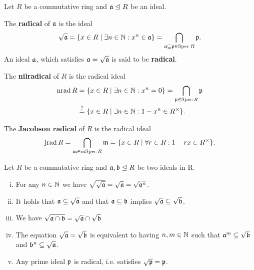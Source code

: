 	\begin{lemma}
	\end{lemma}

	\begin{definition}
		Let $R$ be a commutative ring and $\mathfrak{a} \trianglelefteq R$ be an ideal. 

		The \textbf{radical} of $\mathfrak{a}$ is the ideal 
		\begin{equation*}
			\sqrt{\mathfrak{a}} = \{x \in R \mid \exists n \in \mathbb{N}: x^n \in \mathfrak{a}\} = \bigcap \limits_{\mathfrak{a} \subseteq \mathfrak{p} \in \operatorname{Spec} R} \mathfrak{p}.
		\end{equation*}
		An ideal $\mathfrak{a}$, which satisfies $\mathfrak{a} = \sqrt{\mathfrak{a}}$ is said to be \textbf{radical}.

		The \textbf{nilradical} of $R$ is the radical ideal
		\begin{align*}
			\operatorname{nrad} R &= \{x \in R \mid \exists n \in \mathbb{N}: x^n = 0\} = \bigcap \limits_{\mathfrak{p} \in \operatorname{Spec} R} \mathfrak{p}\\
			& \overset{?}{=} \{x \in R \mid \exists n \in \mathbb{N}: 1 - x^n \in R^\times\}.
		\end{align*}

		The \textbf{Jacobson radical} of $R$ is the radical ideal
		\begin{equation*}
			\operatorname{jrad} R = \bigcap \limits_{\mathfrak{m} \in \operatorname{mSpec} R} \mathfrak{m} = \{x \in R \mid \forall r \in R: 1 - rx \in R^\times\}.
		\end{equation*}
	\end{definition}

	\begin{lemma}
		Let $R$ be a commutative ring and $\mathfrak{a},\mathfrak{b} \trianglelefteq R$ be two ideals in R.
		\begin{enumerate}[(i)]
			\item{
				For any $n \in \mathbb{N}$ we have $\sqrt{\sqrt{\mathfrak{a}}} = \sqrt{\mathfrak{a}} = \sqrt{\mathfrak{a}^n}$.
			}
			\item{
				It holds that $\mathfrak{a} \subseteq \sqrt{\mathfrak{a}}$ and that $\mathfrak{a} \subseteq \mathfrak{b}$ implies $\sqrt{\mathfrak{a}} \subseteq \sqrt{\mathfrak{b}}$.
			}
			\item{
				We have $\sqrt{\mathfrak{a} \cap \mathfrak{b}} = \sqrt{\mathfrak{a}} \cap \sqrt{\mathfrak{b}}$
			}
			\item{
				The equation $\sqrt{\mathfrak{a}} = \sqrt{\mathfrak{b}}$ is equivalent to having $n,m \in \mathbb{N}$ such that $\mathfrak{a}^m \subseteq \sqrt{\mathfrak{b}}$ and $\mathfrak{b}^n \subseteq \sqrt{\mathfrak{a}}$.
			}
			\item{
				Any prime ideal $\mathfrak{p}$ is radical, i.e. satisfies $\sqrt{\mathfrak{p}} = \mathfrak{p}$.
			}
		\end{enumerate}
	\end{lemma}

